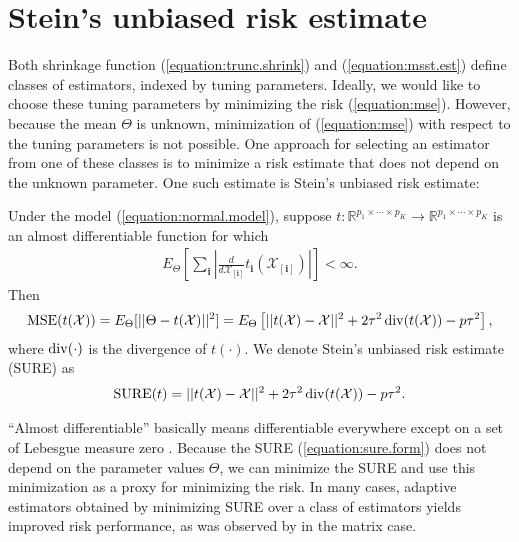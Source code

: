 \section{Stein's unbiased risk estimate}
\label{sec:sure_form}

Both shrinkage function (\ref{equation:trunc.shrink}) and
(\ref{equation:msst.est}) define classes of estimators, indexed by
tuning parameters.  Ideally, we would like to choose these tuning
parameters by minimizing the risk (\ref{equation:mse}). However,
because the mean $\Theta$ is unknown, minimization of
(\ref{equation:mse}) with respect to the tuning parameters is not
possible. One approach for selecting an estimator from one of these
classes is to minimize a risk estimate that does not depend on the
unknown parameter. One such estimate is Stein's unbiased risk
estimate:
\begin{theorem}
  \label{theorem:stein.theorem}
  Under the model (\ref{equation:normal.model}), suppose $t: \mathbb{R}^{p_1\times\cdots\times p_K} \rightarrow \mathbb{R}^{p_1\times\cdots\times p_K}$ is an almost differentiable function for which
  \begin{align}
    \label{equation:int.condition}
    E_{\Theta}\left[\sum_{\mathbf{i}} \left|\frac{d}{d\mathcal{X}_{[\mathbf{i}]}}t_{\mathbf{i}}(\mathcal{X}_{[\mathbf{i}]})\right|\right] < \infty.
  \end{align}
  Then
  \begin{align*}
    \operatorname*{MSE}(t(\mathcal{X})) = E_{\Theta}[||\Theta - t(\mathcal{X})||^2] = E_{\Theta}\left[ ||t(\mathcal{X}) - \mathcal{X}||^2 + 2\tau^2\operatorname*{div}(t(\mathcal{X})) - p\tau^2\right],
  \end{align*}
  where $\operatorname*{div}(\cdot)$ is the divergence of $t(\cdot)$. We denote
  Stein's unbiased risk estimate (SURE) as
  \begin{align}
    \label{equation:sure.form}
    \operatorname*{SURE}(t) = ||t(\mathcal{X}) - \mathcal{X}||^2 + 2\tau^2\operatorname*{div}(t(\mathcal{X})) - p\tau^2.
  \end{align}
\end{theorem}

``Almost differentiable'' basically means differentiable everywhere
except on a set of Lebesgue measure zero \citep[Definition
1]{stein1981estimation}. Because the SURE (\ref{equation:sure.form})
does not depend on the parameter values $\Theta$, we can minimize the
SURE and use this minimization as a proxy for minimizing the risk. In
many cases, adaptive estimators obtained by minimizing SURE over a
class of estimators yields improved risk performance, as was observed
by \cite{candes2013unbiased} in the matrix case.


